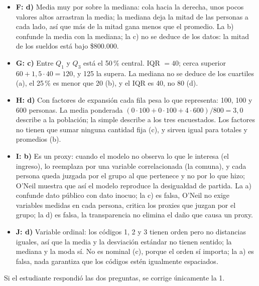 \documentclass[11pt]{article}
\newcommand{\parte}[1]{\vspace{14pt}{\Large\bfseries #1}\vspace{6pt}\par}
\newcommand{\pregunta}[1]{\vspace{10pt}{\large\bfseries #1}\vspace{4pt}\par}
\newcommand{\bloque}[1]{\vspace{6pt}{\bfseries #1}\vspace{2pt}\par}
\begin{document}
\begin{itemize}[itemsep=7pt]
\item \textbf{F: d)} Media muy por sobre la mediana: cola hacia la derecha, unos pocos valores altos arrastran la media; la mediana deja la mitad de las personas a cada lado, así que más de la mitad gana menos que el promedio. La b) confunde la media con la mediana; la c) no se deduce de los datos: la mitad de los sueldos está bajo \$800.000.

\item \textbf{G: c)} Entre $Q_1$ y $Q_3$ está el 50\,\% central. IQR $= 40$; cerca superior $60 + 1{,}5 \cdot 40 = 120$, y 125 la supera. La mediana no se deduce de los cuartiles (a), el 25\,\% es menor que 20 (b), y el IQR es 40, no 80 (d).

\item \textbf{H: d)} Con factores de expansión cada fila pesa lo que representa: 100, 100 y 600 personas. La media ponderada $(0 \cdot 100 + 0 \cdot 100 + 4 \cdot 600)/800 = 3{,}0$ describe a la población; la simple describe a los tres encuestados. Los factores no tienen que sumar ninguna cantidad fija (c), y sirven igual para totales y promedios (b).

\item \textbf{I: b)} Es un proxy: cuando el modelo no observa lo que le interesa (el ingreso), lo reemplaza por una variable correlacionada (la comuna), y cada persona queda juzgada por el grupo al que pertenece y no por lo que hizo; O'Neil muestra que así el modelo reproduce la desigualdad de partida. La a) confunde dato público con dato inocuo; la c) es falsa, O'Neil no exige variables medidas en cada persona, critica los proxies que juzgan por el grupo; la d) es falsa, la transparencia no elimina el daño que causa un proxy.

\item \textbf{J: d)} Variable ordinal: los códigos 1, 2 y 3 tienen orden pero no distancias iguales, así que la media y la desviación estándar no tienen sentido; la mediana y la moda sí. No es nominal (c), porque el orden sí importa; la a) es falsa, nada garantiza que los códigos estén igualmente espaciados.
\end{itemize}

\clearpage
\parte{Parte 2. Desarrollo (40 puntos, una pregunta a elección)}

Si el estudiante respondió las dos preguntas, se corrige únicamente la 1.

\pregunta{Pregunta 1: interpretación de una regresión lineal (40 puntos)}

\bloque{Respuesta esperada}
\end{document}
